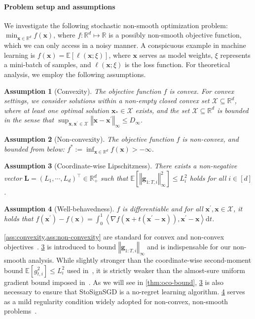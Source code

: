 \documentclass{article}
\newtheorem{ass}{Assumption}
\def \E {\mathbb{E}}
\def \x {\mathbf{x}}
\def \g {\mathbf{g}}
\def \R {\mathbb{R}}
\def \diff {\mathrm{d}}
\def \Lb {\mathbf{L}}
\def \X {\mathcal{X}}
\newcommand{\inner}[2]{\left\langle #1, #2 \right\rangle}
\newcommand{\norm}[1]{\left\Vert#1\right\Vert}
\newcommand{\sqbrac}[1]{\left[#1\right]}
\begin{document}
\paragraph{Problem setup and assumptions} We investigate the following stochastic non-smooth optimization problem: $\min_{\x\in\R^d} f(\x)$, where $f:\R^d\mapsto\R$ is a possibly non-smooth objective function, which we can only access in a noisy manner. A conspicuous example in machine learning is $f(\x)=\E\sqbrac{\ell(\x;\xi)}$, where $\x$ serves as model weights, $\xi$ represents a mini-batch of samples, and $\ell(\x;\xi)$ is the loss function. For theoretical analysis, we employ the following assumptions.
\begin{ass}[Convexity]\label{ass:convexity}
    The objective function $f$ is convex. For convex settings, we consider solutions within a non-empty closed convex set \( \X \subseteq \R^d \), where at least one optimal solution \( \x_* \in \X \) exists, and the set $\X\subseteq\R^d$ is bounded in the sense that $\sup_{\x,\x^\prime\in\X}\norm{\x-\x^\prime}_\infty\le D_\infty$. 
\end{ass}

\begin{ass}[Non-convexity]\label{ass:non-convexity}
    The objective function $f$ is non-convex, and bounded from below: $f^*:=\inf_{\x\in\R^d} f(\x)>-\infty$.
\end{ass}
\begin{ass}[Coordinate-wise Lipschitzness]\label{ass:coord-lipschitz}
    There exists a non-negative vector $\Lb=(L_1,\cdots,\allowbreak L_d)^\top\in\R^d_+$ such that $\E\sqbrac{\norm{\g_{1:T,i}}_\infty^2}\le L_i^2$ holds for all $i\in[d]$. 
\end{ass}

\begin{ass}[Well-behavedness]\label{ass:well-behavedness}
    $f$ is differentiable and for all $\x^\prime,\x\in\X$, it holds that $f(\x^\prime)-f(\x)=\int_0^1\inner{\nabla f(\x+t(\x^\prime-\x))}{\x^\prime-\x}\diff{t}$.



\end{ass}

\cref{ass:convexity,ass:non-convexity} are standard for convex and non-convex objectives~\citep{duchi2011adaptive,arjevani2023lower,liu2025adagrad}. \cref{ass:coord-lipschitz} is introduced to bound $\norm{\g_{1:T,i}}_\infty$ and is indispensable for our non-smooth analysis. While slightly stronger than the coordinate-wise second-moment bound $\E[g_{t,i}^2]\le L_i^2$ used in~\citet{cutkosky2023optimal}, it is strictly weaker than the almost-sure uniform gradient bound imposed in~\citet{chzhen2023signsvrg,sun2023momentum,NeurIPS:2024:Jiang,jiang2025improved}. As we will see in \cref{thm:oco-bound}, \cref{ass:coord-lipschitz} is also necessary to ensure that StoSignSGD is a no-regret learning algorithm. \cref{ass:well-behavedness} serves as a mild regularity condition widely adopted for non-convex, non-smooth problems~\citep{cutkosky2023optimal,zhang2024random,ICML:2024:Liu,ahn2024adamema,ahn2025general,jiangSTOC2025improved,liu2026old}.
\end{document}
